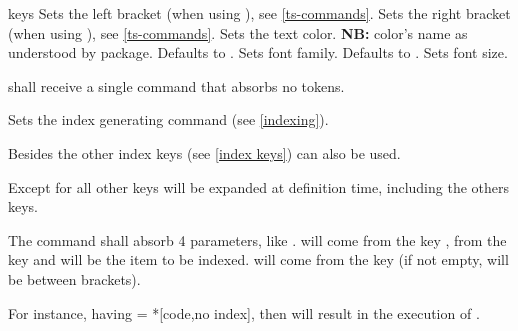 \documentclass{article}
\begin{document}
\begin{describelist*}{keys}
    {Sets the left bracket (when using \tsobj{\tsargs}), see \ref{ts-commands}.}
    {Sets the right bracket (when using \tsobj{\tsargs}), see \ref{ts-commands}.}
     {Sets the text color. \textbf{NB:} color's name as understood by  package.}
   {Defaults to . Sets font family.}
   {Defaults to . Sets font size.}
  \begin{tsremark}
     shall receive a single command that absorbs no tokens.
  \end{tsremark}
   {Sets the index generating command (see \ref{indexing}). }
  \begin{tsremark}
    Besides  the other index keys (see \ref{index keys}) can also be used.
  \end{tsremark}
  \begin{tsremark}
    Except for  all other keys will be expanded at definition time, including the others  keys.
  \end{tsremark}
  \begin{tsremark}
   The   command shall absorb 4 parameters, like .   will come from the key ,  from the key  and  will be the item to be indexed.  will come from the key  (if not empty,   will be between brackets). 
  
  For instance, having  = \tsverb**[code,no index]{\usercmd}, then
  \tsverb[oarg]{[index name = iname, index prefix = pre, index group = grp]}
  \tsverb[marg]{{ \some }} will result in the execution of   
  .
  \end{tsremark}
\end{describelist*}
\end{document}
